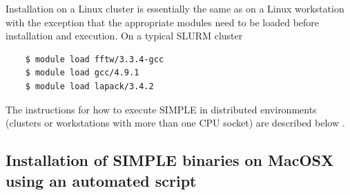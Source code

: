 \documentclass[a4paper,11pt]{article}
\begin{document}
Installation on a Linux cluster is essentially the same as on a Linux workstation with the exception that the appropriate modules need to be loaded before installation and execution. On a typical SLURM cluster

\begin{verbatim}
    $ module load fftw/3.3.4-gcc
    $ module load gcc/4.9.1
    $ module load lapack/3.4.2 
\end{verbatim}

The instructions for how to execute SIMPLE in distributed environments (clusters or workstations with more than one CPU socket) are described below \label{distr}.

\subsection{Installation of SIMPLE binaries on MacOSX using an automated script}
\label{inst_auto_binaries_macosx}
\end{document}
